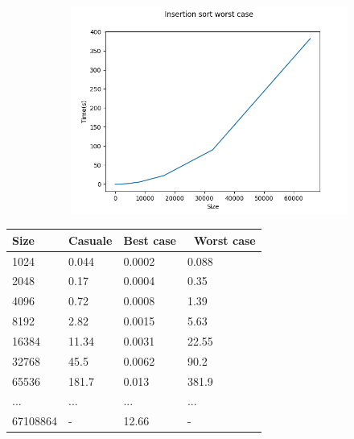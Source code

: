 \documentclass[]{article}
\begin{document}
\begin{figure}[H]
\begin{subfigure}[b]{0.4\linewidth}
        \label{fig:insertion_best}
    \end{subfigure}
    \\
    \begin{subfigure}[b]{0.4\linewidth}
        \centering
        \includegraphics[width=\textwidth]{InsertionSortWorstCase}
        \label{fig:insertion_worst}
    \end{subfigure}
\end{figure}

\begin{table}[H]
\centering
\label{tab:insertion}
\begin{tabular}{|l|l|l|l|} 
\hline
Size     & Casuale & Best case & ~Worst case  \\ 
\hline
1024     & 0.044   & 0.0002    & 0.088        \\
2048     & 0.17    & 0.0004    & 0.35         \\
4096     & 0.72    & 0.0008    & 1.39         \\
8192     & 2.82    & 0.0015    & 5.63         \\
16384    & 11.34   & 0.0031    & 22.55        \\
32768    & 45.5    & 0.0062    & 90.2         \\
65536    & 181.7   & 0.013     & 381.9        \\
...      & ...     & ...       & ...          \\
67108864 & -       & 12.66     & -            \\
\hline
\end{tabular}
\end{table}
\end{document}

